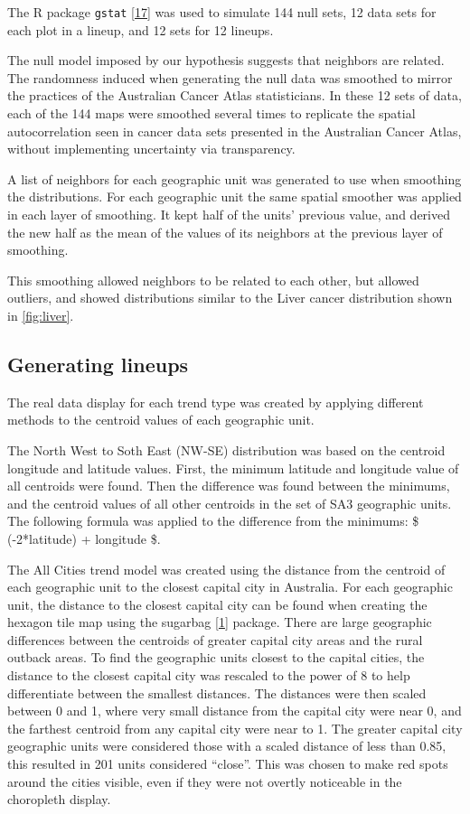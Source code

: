 \documentclass[conference,final,]{IEEEtran}
\begin{document}
The R package \texttt{gstat} {[}\protect\hyperlink{ref-gstat}{17}{]} was used to simulate 144 null sets, 12 data sets for each plot in a lineup, and 12 sets for 12 lineups.

The null model imposed by our hypothesis suggests that neighbors are related. The randomness induced when generating the null data was smoothed to mirror the practices of the Australian Cancer Atlas statisticians.
In these 12 sets of data, each of the 144 maps were smoothed several times to replicate the spatial autocorrelation seen in cancer data sets presented in the Australian Cancer Atlas, without implementing uncertainty via transparency.

A list of neighbors for each geographic unit was generated to use when smoothing the distributions. For each geographic unit the same spatial smoother was applied in each layer of smoothing. It kept half of the units' previous value, and derived the new half as the mean of the values of its neighbors at the previous layer of smoothing.

This smoothing allowed neighbors to be related to each other, but allowed outliers, and showed distributions similar to the Liver cancer distribution shown in \ref{fig:liver}.

\hypertarget{generating-lineups}{%
\subsection{Generating lineups}\label{generating-lineups}}

The real data display for each trend type was created by applying different methods to the centroid values of each geographic unit.

The North West to Soth East (NW-SE) distribution was based on the centroid longitude and latitude values. First, the minimum latitude and longitude value of all centroids were found. Then the difference was found between the minimums, and the centroid values of all other centroids in the set of SA3 geographic units.
The following formula was applied to the difference from the minimums: \$ (-2*latitude) + longitude \$.

The All Cities trend model was created using the distance from the centroid of each geographic unit to the closest capital city in Australia. For each geographic unit, the distance to the closest capital city can be found when creating the hexagon tile map using the sugarbag {[}\protect\hyperlink{ref-sugarbag}{1}{]} package.
There are large geographic differences between the centroids of greater capital city areas and the rural outback areas.
To find the geographic units closest to the capital cities, the distance to the closest capital city was rescaled to the power of 8 to help differentiate between the smallest distances.
The distances were then scaled between 0 and 1, where very small distance from the capital city were near 0, and the farthest centroid from any capital city were near to 1. The greater capital city geographic units were considered those with a scaled distance of less than 0.85, this resulted in 201 units considered ``close''. This was chosen to make red spots around the cities visible, even if they were not overtly noticeable in the choropleth display.
\end{document}
